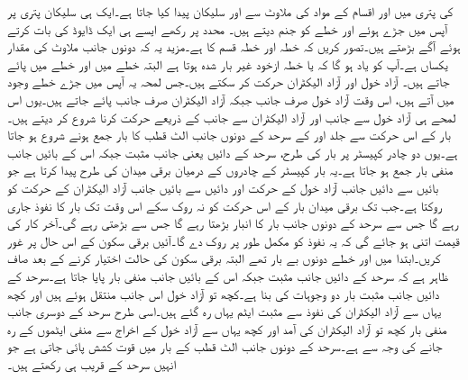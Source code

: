  کی پتری میں  اور  اقسام کے مواد کی ملاوٹ سے  اور  سلیکان پیدا کیا جاتا ہے۔ایک ہی سلیکان پتری پر آپس میں جڑے ہوئے  اور  خطے  کو جنم دیتے ہیں۔ محدد پر رکھے ایسے ہی ایک ڈایوڈ کی بات کرتے ہوئے آگے بڑھتے ہیں۔تصور کریں کہ  خطہ  اور  خطہ  قسم کا ہے۔مزید یہ کہ دونوں جانب ملاوٹ کی مقدار یکساں ہے۔آپ کو یاد ہو گا کہ  یا  خطہ ازخود غیر بار شدہ ہوتا ہے البتہ  خطے میں  اور  خطے میں  پائے جاتے ہیں۔ آزاد خول اور آزاد الیکٹران حرکت کر سکتے ہیں۔جس لمحہ یہ آپس میں جڑے خطے وجود میں آتے ہیں، اس وقت آزاد خول صرف  جانب جبکہ آزاد الیکٹران صرف  جانب پائے جاتے ہیں۔یوں اس لمحے ہی  آزاد خول  سے  جانب اور آزاد الیکٹران  سے  جانب   کے ذریعے حرکت کرنا شروع کر دیتے ہیں۔بار کے اس حرکت سے جلد  اور  کے سرحد کے دونوں جانب الٹ قطب کا بار جمع ہونے شروع ہو جاتا ہے۔یوں دو چادر کپیسٹر پر بار کی طرح، سرحد کے دائیں یعنی  جانب مثبت جبکہ اس کے بائیں جانب منفی بار جمع ہو جاتا ہے۔یہ بار کپیسٹر کے چادروں کے درمیان برقی میدان کی طرح  پیدا کرتا ہے جو بائیں سے دائیں جانب آزاد خول کے حرکت اور دائیں سے بائیں جانب آزاد الیکٹران کے حرکت  کو روکتا ہے۔جب تک برقی میدان  بار کے اس حرکت کو نہ روک سکے اس وقت تک بار کا نفوذ جاری رہے گا جس سے سرحد کے دونوں جانب بار کا انبار بڑھتا رہے گا جس سے  بڑھتی رہے گی۔آخر کار   کی قیمت اتنی ہو جائے گی کہ یہ نفوذ کو مکمل طور پر روک دے گا۔آئیں برقی سکون کے اس حال پر غور کریں۔ابتدا میں  اور  خطے دونوں بے بار تھے البتہ برقی سکون کی حالت اختیار کرنے کے بعد صاف ظاہر ہے کہ سرحد کے دائیں جانب مثبت جبکہ اس کے بائیں جانب منفی بار پایا جاتا ہے۔سرحد کے  دائیں جانب مثبت بار دو وجوہات کی بنا ہے۔کچھ تو آزاد خول اس جانب منتقل ہوئے ہیں اور کچھ یہاں سے آزاد الیکٹران کی نفوذ سے مثبت ایٹم یہاں رہ گئے ہیں۔اسی طرح سرحد کے دوسری جانب منفی بار کچھ تو آزاد الیکٹران کی آمد اور کچھ یہاں سے آزاد خول کے اخراج سے  منفی ایٹموں کے رہ جانے کی وجہ سے ہے۔سرحد کے دونوں جانب الٹ قطب کے بار میں قوت کشش پائی جاتی ہے جو انہیں سرحد کے قریب ہی رکھتے ہیں۔

